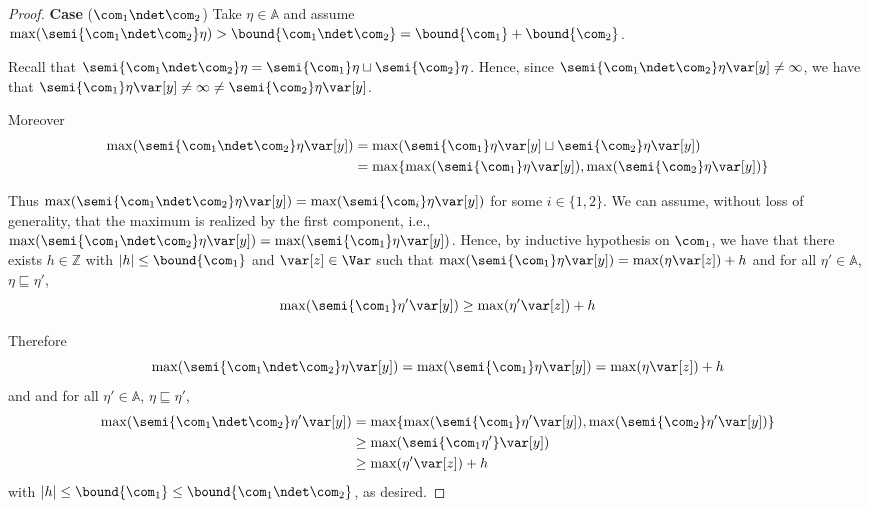 \begin{proof}
  
  \medskip
  
  \noindent
  \textbf{Case} (\(\com_1 \ndet \com_2\))
  Take \(\eta \in \mathbb{A}\) and assume
  \(\max(\semi{\com_1 \ndet \com_2}\eta) > \bound{\com_1 \ndet \com_2} =
  \bound{\com_1} + \bound{\com_2}\).

  Recall that
  \(\semi{\com_1 \ndet \com_2} \eta = \semi{\com_1}\eta \sqcup \semi{\com_2}\eta\).
  Hence, since \(\semi{\com_1 \ndet \com_2} \eta \var[y] \neq \infty\), we have
  that \(\semi{\com_1} \eta \var[y] \neq \infty \neq \semi{\com_2}\eta \var[y]\).

  Moreover
  \begin{align*}
    \max(\semi{\com_1 \ndet \com_2}\eta \var[y])& =  \max(\semi{\com_1}\eta \var[y] \sqcup \semi{\com_2}\eta \var[y]) \\ 
    & = \max \{ \max(\semi{\com_1}\eta \var[y]), \max(\semi{\com_2}\eta \var[y])\}
  \end{align*}

  Thus
  \(\max(\semi{\com_1 \ndet \com_2}\eta \var[y]) =
  \max(\semi{\com_i}\eta \var[y])\) for some \(i \in \{1,2\}\). We can
  assume, without loss of generality, that the maximum is realized
  by the first component, i.e.,
  \(\max(\semi{\com_1 \ndet \com_2}\eta \var[y]) =
  \max(\semi{\com_1}\eta \var[y])\). Hence, by inductive hypothesis on
  \(\com_1\), we have that there exists \(h \in \mathbb{Z}\) with
  \(|h| \leq \bound{\com_1}\) and \(\var[z] \in \Var\) such that
  \(\max(\semi{\com_1}\eta \var[y]) = \max(\eta \var[z]) + h\) and for
  all \(\eta' \in \mathbb{A}\), \(\eta \sqsubseteq \eta'\),
  \[
  \max(\semi{\com_1}\eta' \var[y]) \geq \max(\eta' \var[z]) + h
  \]

  Therefore 
  \[
  \max(\semi{\com_1 \ndet \com_2}\eta \var[y])
  = \max(\semi{\com_1}\eta \var[y]) = \max(\eta \var[z]) + h
  \]
  and and for
  all \(\eta' \in \mathbb{A}\), \(\eta \sqsubseteq \eta'\),
  \begin{align*}
    \max(\semi{\com_1 \ndet \com_2}\eta' \var[y])
    &= \max\{ \max(\semi{\com_1}\eta' \var[y]),  \max(\semi{\com_2}\eta' \var[y])\}\\
    & \geq \max(\semi{\com_1\eta'} \var[y])\\
    & \geq \max(\eta' \var[z]) + h
  \end{align*}
  with \(|h| \leq \bound{\com_1} \leq \bound{\com_1 \ndet \com_2}\), as desired.


  

\end{proof}
